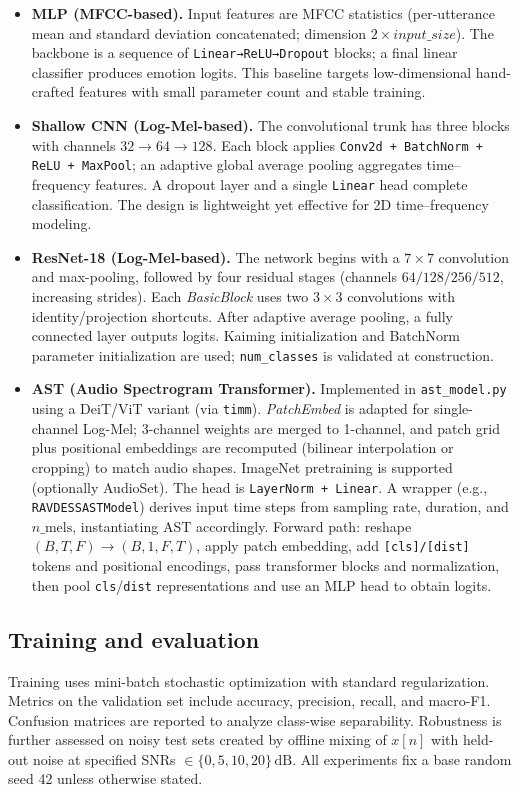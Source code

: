 \begin{itemize}
  \item \textbf{MLP (MFCC-based).} Input features are MFCC statistics (per-utterance mean and standard deviation concatenated; dimension \(2\times\textit{input\_size}\)). The backbone is a sequence of \texttt{Linear→ReLU→Dropout} blocks; a final linear classifier produces emotion logits. This baseline targets low-dimensional hand-crafted features with small parameter count and stable training.
  \item \textbf{Shallow CNN (Log-Mel-based).} The convolutional trunk has three blocks with channels \(32\to64\to128\). Each block applies \texttt{Conv2d + BatchNorm + ReLU + MaxPool}; an adaptive global average pooling aggregates time–frequency features. A dropout layer and a single \texttt{Linear} head complete classification. The design is lightweight yet effective for 2D time–frequency modeling.
  \item \textbf{ResNet-18 (Log-Mel-based).} The network begins with a \(7\times7\) convolution and max-pooling, followed by four residual stages (channels \(64/128/256/512\), increasing strides). Each \textit{BasicBlock} uses two \(3\times3\) convolutions with identity/projection shortcuts. After adaptive average pooling, a fully connected layer outputs logits. Kaiming initialization and BatchNorm parameter initialization are used; \texttt{num\_classes} is validated at construction.
  \item \textbf{AST (Audio Spectrogram Transformer).} Implemented in \texttt{ast\_model.py} using a DeiT/ViT variant (via \texttt{timm}). \textit{PatchEmbed} is adapted for single-channel Log-Mel; 3-channel weights are merged to 1-channel, and patch grid plus positional embeddings are recomputed (bilinear interpolation or cropping) to match audio shapes. ImageNet pretraining is supported (optionally AudioSet). The head is \texttt{LayerNorm + Linear}. A wrapper (e.g., \texttt{RAVDESSASTModel}) derives input time steps from sampling rate, duration, and \(n\_\mathrm{mels}\), instantiating AST accordingly. Forward path: reshape \((B,T,F)\to(B,1,F,T)\), apply patch embedding, add \texttt{[cls]/[dist]} tokens and positional encodings, pass transformer blocks and normalization, then pool \texttt{cls}/\texttt{dist} representations and use an MLP head to obtain logits.
\end{itemize}



\subsection{Training and evaluation}
Training uses mini-batch stochastic optimization with standard regularization. Metrics on the validation set include accuracy, precision, recall, and macro-F1. Confusion matrices are reported to analyze class-wise separability. Robustness is further assessed on noisy test sets created by offline mixing of \(x[n]\) with held-out noise at specified SNRs \(\in \{0,5,10,20\}\,\mathrm{dB}\). All experiments fix a base random seed 42 unless otherwise stated.

